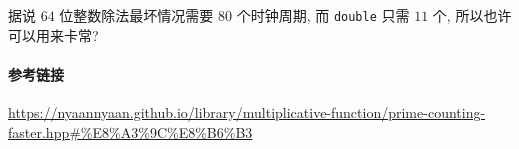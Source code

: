 据说 \(64\) 位整数除法最坏情况需要 \(80\) 个时钟周期, 而 \verb|double| 只需 \(11\) 个, 所以也许可以用来卡常?

\paragraph{参考链接}

\url{https://nyaannyaan.github.io/library/multiplicative-function/prime-counting-faster.hpp#%E8%A3%9C%E8%B6%B3}
